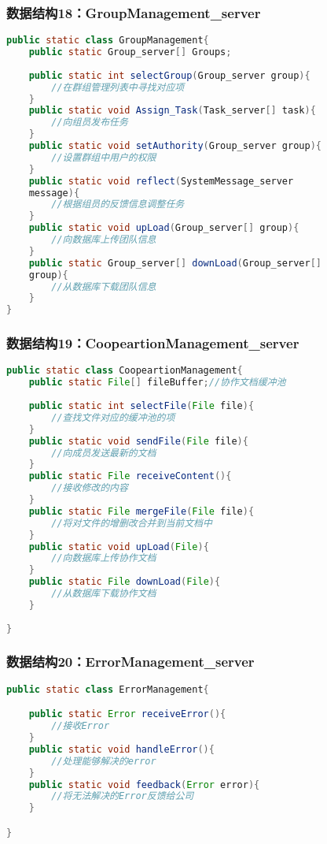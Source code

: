 \subsubsection{数据结构18：GroupManagement\_server}
\begin{lstlisting}[language=Java, caption=团队管理类]
public static class GroupManagement{
    public static Group_server[] Groups;
    
    public static int selectGroup(Group_server group){
        //在群组管理列表中寻找对应项
    }
    public static void Assign_Task(Task_server[] task){
        //向组员发布任务
    }
    public static void setAuthority(Group_server group){
        //设置群组中用户的权限
    }
    public static void reflect(SystemMessage_server 
    message){
        //根据组员的反馈信息调整任务
    }
    public static void upLoad(Group_server[] group){
        //向数据库上传团队信息
    }
    public static Group_server[] downLoad(Group_server[] 
    group){
        //从数据库下载团队信息
    }
}
\end{lstlisting}
\subsubsection{数据结构19：CoopeartionManagement\_server}
\begin{lstlisting}[language=Java, caption=在线协作类]
public static class CoopeartionManagement{
    public static File[] fileBuffer;//协作文档缓冲池
    
    public static int selectFile(File file){
        //查找文件对应的缓冲池的项
    }
    public static void sendFile(File file){
        //向成员发送最新的文档
    }
    public static File receiveContent(){
        //接收修改的内容
    }
    public static File mergeFile(File file){
        //将对文件的增删改合并到当前文档中
    }
    public static void upLoad(File){
        //向数据库上传协作文档
    }
    public static File downLoad(File){
        //从数据库下载协作文档
    }
    
} 
\end{lstlisting}
\subsubsection{数据结构20：ErrorManagement\_server}
\begin{lstlisting}[language=Java, caption=在线协作类]
public static class ErrorManagement{

    public static Error receiveError(){
        //接收Error
    }
    public static void handleError(){
        //处理能够解决的error
    }
    public static void feedback(Error error){
        //将无法解决的Error反馈给公司
    }

} 
\end{lstlisting}




